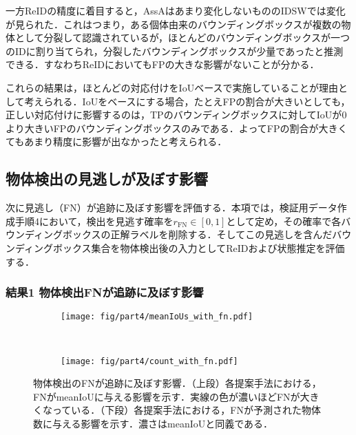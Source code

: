         一方ReIDの精度に着目すると，AssAはあまり変化しないもののIDSWでは変化が見られた．これはつまり，ある個体由来のバウンディングボックスが複数の物体として分裂して認識されているが，ほとんどのバウンディングボックスが一つのIDに割り当てられ，分裂したバウンディングボックスが少量であったと推測できる．すなわちReIDにおいてもFPの大きな影響がないことが分かる．

        これらの結果は，ほとんどの対応付けをIoUベースで実施していることが理由として考えられる．IoUをベースにする場合，たとえFPの割合が大きいとしても，正しい対応付けに影響するのは，TPのバウンディングボックスに対してIoUが$0$より大きいFPのバウンディングボックスのみである．よってFPの割合が大きくてもあまり精度に影響が出なかったと考えられる．

    \subsection{物体検出の見逃しが及ぼす影響}
    \label{subsec:FNeffect}

    次に見逃し（FN）が追跡に及ぼす影響を評価する．本項では，検証用データ作成手順4において，検出を見逃す確率を$r_{\text{FN}} \in [0, 1]$として定め，その確率で各バウンディングボックスの正解ラベルを削除する．そしてこの見逃しを含んだバウンディングボックス集合を物体検出後の入力としてReIDおよび状態推定を評価する．

        \subsubsection{結果1 物体検出FNが追跡に及ぼす影響}

        \begin{figure}[t]
            \begin{subfigure}[t]{\linewidth}
                \centering
                \texttt{[image: fig/part4/meanIoUs\_with\_fn.pdf]}
            \end{subfigure}
            \\
            \begin{subfigure}[t]{\linewidth}
                \centering
                \texttt{[image: fig/part4/count\_with\_fn.pdf]}
            \end{subfigure}
            \caption[物体検出のFNが追跡に及ぼす影響]{物体検出のFNが追跡に及ぼす影響．（上段）各提案手法における，FNがmeanIoUに与える影響を示す．実線の色が濃いほどFNが大きくなっている．（下段）各提案手法における，FNが予測された物体数に与える影響を示す．濃さはmeanIoUと同義である．}
            \label{fig:FN_effect}
        \end{figure}

